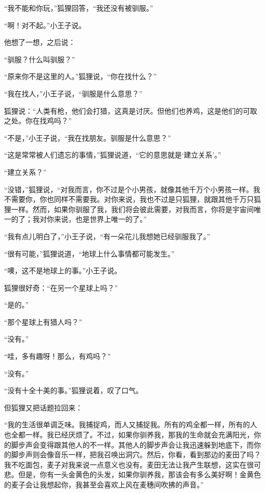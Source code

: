 “我不能和你玩，”狐狸回答，“我还没有被驯服。”

“啊！对不起。”小王子说。

{\startalignment[center]
 \stopalignment}

他想了一想，之后说：

“驯服？什么叫驯服？”

“原来你不是这里的人。”狐狸说，“你在找什么？”

“我在找人，”小王子说，“驯服是什么意思？”

狐狸说：“人类有枪，他们会打猎，这真是讨厌。但他们也养鸡，这是他们的可取之处。你在找鸡吗？”

“不是，”小王子说，“我在找朋友。驯服是什么意思？”

“这是常常被人们遗忘的事情，”狐狸说道，“它的意思就是‘建立关系'。”

“建立关系？”

“没错，”狐狸说，“对我而言，你不过是个小男孩，就像其他千万个小男孩一样。我不需要你，你也同样不需要我。对你来说，我也不过是只狐狸，就跟其他千万只狐狸一样。然而，如果你驯服了我，我们将会彼此需要，对我而言，你将是宇宙间唯一的了；我对你来说，也是世界上唯一的了。”

“我有点儿明白了，”小王子说，“有一朵花儿我想她已经驯服我了。”

“很有可能，”狐狸说道，“地球上什么事情都可能发生。”

“噢，这不是地球上的事。”小王子说。

狐狸很好奇：“在另一个星球上吗？”

“是的。”

“那个星球上有猎人吗？”

“没有。”

“哇，多有趣呀！那么，有鸡吗？”

“没有。”

“没有十全十美的事。”狐狸说着，叹了口气。

但狐狸又把话题拉回来：

“我的生活很单调乏味。我捕捉鸡，而人又捕捉我。所有的鸡全都一样，所有的人也全都一样。我已经厌烦了。不过，如果你驯养我，那我的生命就会充满阳光，你的脚步声会变得跟其他人的不一样。其他人的脚步声会让我迅速躲到地底下，而你的脚步声则会像音乐一样，把我召唤出洞穴。然后，你看，看到那边的麦田了吗？我不吃面包，麦子对我来说一点意义也没有。麦田无法让我产生联想，这实在很可悲。但是，你有一头金黄色的头发，如果你驯养我，那该会有多么美好啊！金黄色的麦子会让我想起你，我甚至会喜欢上风在麦穗间吹拂的声音。”

